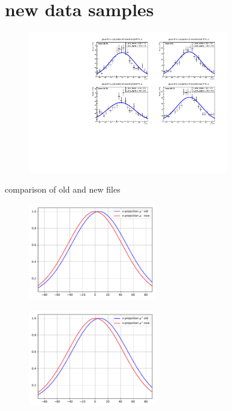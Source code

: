 \section{new data samples}

\begin{frame}[t]{}
  \begin{figure}
    \centering
    \includegraphics[width=0.78\textwidth]{../hists/nofield/new/gauss_fit.pdf}
  \end{figure}
\end{frame}

\begin{frame}[t]{comparison of old and new files}
  \begin{multicols}{2}
    \begin{figure}
      \centering
      \includegraphics[width=0.5\textwidth]{../hists/nofield/comp/gauss_comparison_x-.pdf}
    \end{figure}
    \columnbreak
    \begin{figure}
      \centering
      \includegraphics[width=0.5\textwidth]{../hists/nofield/comp/gauss_comparison_x+.pdf}
    \end{figure}
  \end{multicols}
\end{frame}

